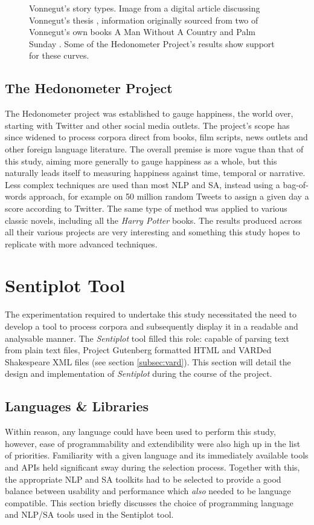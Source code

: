 \documentclass{article}
\begin{document}
{\begin{figure}[htbp]
            \caption{Vonnegut's story types. Image from a digital article discussing Vonnegut's thesis \citep{vonnegutThesis}, information originally sourced from two of Vonnegut's own books \textup{A Man Without A Country} \citep{vonnegut_simon_2007} and \textup{Palm Sunday} \citep{vonnegut_1981}. Some of the Hedonometer Project's results show support for these curves.}
            \label{fig:storyTypes}
        \end{figure}
        
    \subsection{The Hedonometer Project}
    \label{subsec:hedonometer}
        The Hedonometer project was established to gauge happiness, the world over, starting with Twitter and other social media outlets. The project’s scope has since widened to process corpora direct from books, film scripts, news outlets and other foreign language literature. The overall premise is more vague than that of this study, aiming more generally to gauge happiness as a whole, but this naturally leads itself to measuring happiness against time, temporal or narrative. 
        Less complex techniques are used than most NLP and SA, instead using a bag-of-words approach, for example on 50 million random Tweets to assign a given day a score according to Twitter. The same type of method was applied to various classic novels, including all the \textit{Harry Potter} books. The results produced across all their various projects are very interesting and something this study hopes to replicate with more advanced techniques.
\newpage
\section{Sentiplot Tool}
\label{sec:sentiplot}
The experimentation required to undertake this study necessitated the need to develop a tool to process corpora and subsequently display it in a readable and analysable manner. The \textit{Sentiplot} tool filled this role: capable of parsing text from plain text files, Project Gutenberg formatted HTML and VARDed Shakespeare XML files (see section \ref{subsec:vard}). This section will detail the design and implementation of \textit{Sentiplot} during the course of the project. 
    \subsection{Languages \& Libraries}
    Within reason, any language could have been used to perform this study, however, ease of programmability and extendibility were also high up in the list of priorities. Familiarity with a given language and its immediately available tools and APIs held significant sway during the selection process. Together with this, the appropriate NLP and SA toolkits had to be selected to provide a good balance between usability and performance which \textit{also} needed to be language compatible. This section briefly discusses the choice of programming language and NLP/SA tools used in the Sentiplot tool.
}
\end{document}

